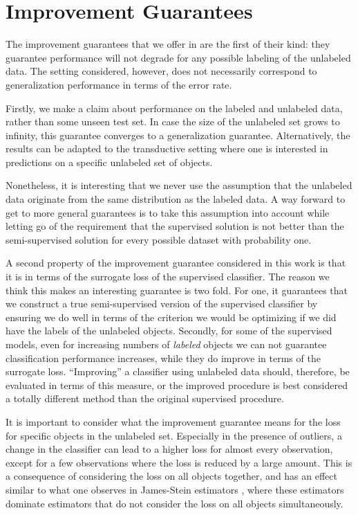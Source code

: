 \documentclass[twoside]{memoir}\usepackage[]{graphicx}\usepackage{xcolor}
\begin{document}
\section{Improvement Guarantees}
The improvement guarantees that we offer in  are the first of their kind: they guarantee performance will not degrade for any possible labeling of the unlabeled data. The setting considered, however, does not necessarily correspond to generalization performance in terms of the error rate. 

Firstly, we make a claim about performance on the labeled and unlabeled data, rather than some unseen test set. In case the size of the unlabeled set grows to infinity, this guarantee converges to a generalization guarantee. Alternatively, the results can be adapted to the transductive setting where one is interested in predictions on a specific unlabeled set of objects. 

Nonetheless, it is interesting that we never use the assumption that the unlabeled data originate from the same distribution as the labeled data. A way forward to get to more general guarantees is to take this assumption into account while letting go of the requirement that the supervised solution is not better than the semi-supervised solution for every possible dataset with probability one.

A second property of the improvement guarantee considered in this work is that it is in terms of the surrogate loss of the supervised classifier. The reason we think this makes an interesting guarantee is two fold. For one, it guarantees that we construct a true semi-supervised version of the supervised classifier by ensuring we do well in terms of the criterion we would be optimizing if we did have the labels of the unlabeled objects. Secondly, for some of the supervised models, even for increasing  numbers of \emph{labeled} objects we can not guarantee classification performance increases, while they do improve in terms of the surrogate loss. ``Improving'' a classifier using unlabeled data should, therefore, be evaluated in terms of this measure, or the improved procedure is best considered a totally different method than the original supervised procedure.

It is important to consider what the improvement guarantee means for the loss for specific objects in the unlabeled set. Especially in the presence of outliers, a change in the classifier can lead to a higher loss for almost every observation, except for a few observations where the loss is reduced by a large amount. This is a consequence of considering the loss on all objects together, and has an effect similar to what one observes in James-Stein estimators \citep{Efron1977}, where these estimators dominate estimators that do not consider the loss on all objects simultaneously.
\end{document}
